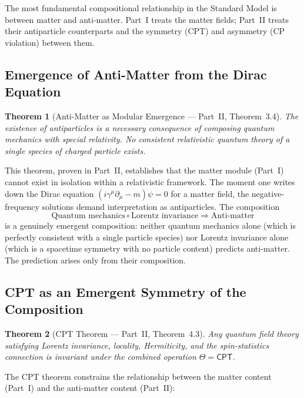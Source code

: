 \documentclass[12pt]{article}
\newtheorem{theorem}{Theorem}[section]
\theoremstyle{definition}
\theoremstyle{remark}
\newcommand{\CPT}{\mathsf{CPT}}
\begin{document}
The most fundamental compositional relationship in the Standard Model is between matter and anti-matter. Part~I treats the matter fields; Part~II treats their antiparticle counterparts and the symmetry (CPT) and asymmetry (CP violation) between them.

\subsection{Emergence of Anti-Matter from the Dirac Equation}

\begin{theorem}[Anti-Matter as Modular Emergence --- Part~II, Theorem~3.4]
\label{thm:antimatter-emergence}
The existence of antiparticles is a necessary consequence of composing quantum mechanics with special relativity. No consistent relativistic quantum theory of a single species of charged particle exists.
\end{theorem}

This theorem, proven in Part~II, establishes that the matter module (Part~I) cannot exist in isolation within a relativistic framework. The moment one writes down the Dirac equation $(i\gamma^\mu\partial_\mu - m)\psi = 0$ for a matter field, the negative-frequency solutions demand interpretation as antiparticles. The composition
\begin{equation}
\text{Quantum mechanics} \circ \text{Lorentz invariance} \Rightarrow \text{Anti-matter}
\end{equation}
is a genuinely emergent composition: neither quantum mechanics alone (which is perfectly consistent with a single particle species) nor Lorentz invariance alone (which is a spacetime symmetry with no particle content) predicts anti-matter. The prediction arises only from their composition.

\subsection{CPT as an Emergent Symmetry of the Composition}

\begin{theorem}[CPT Theorem --- Part~II, Theorem~4.3]
\label{thm:cpt-emergent}
Any quantum field theory satisfying Lorentz invariance, locality, Hermiticity, and the spin-statistics connection is invariant under the combined operation $\Theta = \CPT$.
\end{theorem}

The CPT theorem constrains the relationship between the matter content (Part~I) and the anti-matter content (Part~II):
\end{document}
